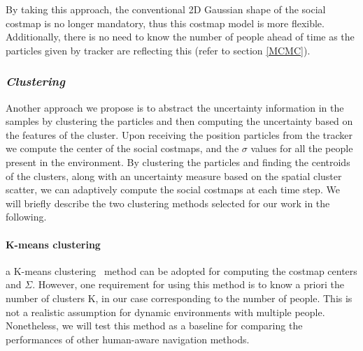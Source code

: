 

   
By taking this approach, the conventional 2D Gaussian shape of the social costmap is no longer mandatory, thus this costmap model is more flexible. Additionally, there is no need to know the number of people ahead of time as the particles given by tracker are reflecting this (refer to section \ref{MCMC}).%


\subsubsection*{\normalfont \textit{Clustering}}
Another approach we propose is to abstract the uncertainty information in the samples by clustering the particles and then computing the uncertainty based on the features of the cluster. Upon receiving the position particles from the tracker we compute the center of the social costmaps, and the ${\sigma}$ values for all the people present in the environment. By clustering the particles and finding the centroids of the clusters, along with an uncertainty measure based on the spatial cluster scatter, we can adaptively compute the social costmaps at each time step. We will briefly describe the two clustering methods selected for our work in the following.
\paragraph{K-means clustering}

a K-means clustering%
~method can be adopted for computing the costmap centers and $\Sigma$. However, one requirement for using this method is 
to know a priori the number of clusters K, in our case corresponding to the number of people. This is not a realistic assumption for dynamic environments with multiple people. Nonetheless, we will test this method as a baseline for comparing the performances of other human-aware navigation methods.%

